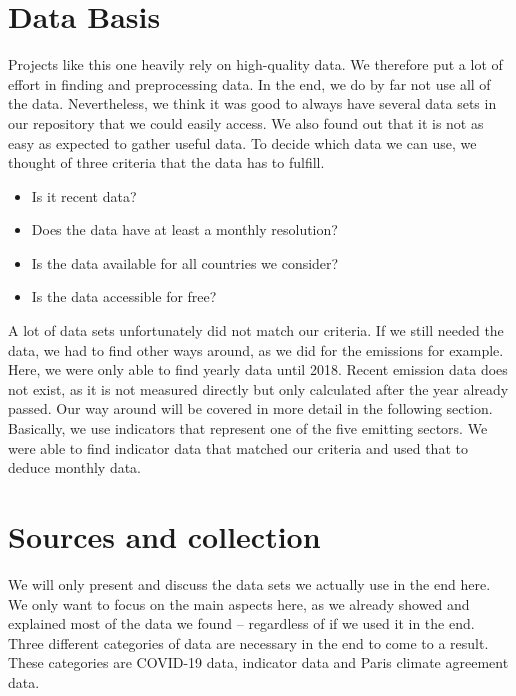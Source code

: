 \section{Data Basis}


Projects like this one heavily rely on high-quality data. We therefore put a lot of effort in finding and preprocessing data. In the end, we do by far not use all of the data. Nevertheless, we think it was good to always have several data sets in our repository that we could easily access. We also found out that it is not as easy as expected to gather useful data. To decide which data we can use, we thought of three criteria that the data has to fulfill.

\begin{itemize}
	\item Is it recent data?
	\item Does the data have at least a monthly resolution?
	\item Is the data available for all countries we consider?
	\item Is the data accessible for free?
\end{itemize}

A lot of data sets unfortunately did not match our criteria. If we still needed the data, we had to find other ways around, as we did for the \co emissions for example. Here, we were only able to find yearly data until 2018. Recent \co emission data does not exist, as it is not measured directly but only calculated after the year already passed. Our way around will be covered in more detail in the following section. Basically, we use indicators that represent one of the five \co emitting sectors. We were able to find indicator data that matched our criteria and used that to deduce monthly \co data.


\section*{Sources and collection}
We will only present and discuss the data sets we actually use in the end here. We only want to focus on the main aspects here, as we already showed and explained most of the data we found -- regardless of if we used it in the end. Three different categories of data are necessary in the end to come to a result. These categories are COVID-19 data, indicator data and Paris climate agreement data.

